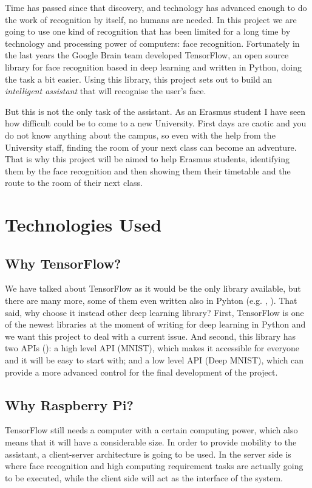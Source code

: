 Time has passed since that discovery, and technology has advanced enough to do the work of recognition by itself, no humans are needed. In this project we are going to use one kind of recognition that has been limited for a long time by technology and processing power of computers: face recognition. Fortunately in the last years the Google Brain team developed TensorFlow, an open source library for face recognition based in deep learning and written in Python, doing the task a bit easier. Using this library, this project sets out to build an \textit{intelligent assistant} that will recognise the user's face.

But this is not the only task of the assistant. As an Erasmus student I have seen how difficult could be to come to a new University. First days are caotic and you do not know anything about the campus, so even with the help from the University staff, finding the room of your next class can become an adventure. That is why this project will be aimed to help Erasmus students, identifying them by the face recognition and then showing them their timetable and the route to the room of their next class.

\section{Technologies Used}	

	\subsection{Why TensorFlow?}
	We have talked about TensorFlow as it would be the only library available, but there are many more, some of them even written also in Pyhton (e.g. \cite{theano_main_site}, \cite{caffe_main_site}). That said, why choose it instead other deep learning library? First, TensorFlow is one of the newest libraries at the moment of writing for deep learning in Python and we want this project to deal with a current issue. And second, this library has two APIs (\cite{tensorflow_main_website}): a high level API (MNIST), which makes it accessible for everyone and it will be easy to start with; and a low level API (Deep MNIST), which can provide a more advanced control for the final development of the project.

	\subsection{Why Raspberry Pi?}
	TensorFlow still needs a computer with a certain computing power, which also means that it will have a considerable size. In order to provide mobility to the assistant, a client-server architecture is going to be used. In the server side is where face recognition and high computing requirement tasks are actually going to be executed, while the client side will act as the interface of the system. 

